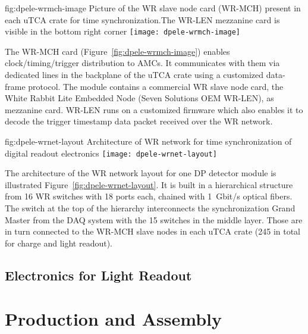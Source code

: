 \begin{dunefigure}{fig:dpele-wrmch-image}
{Picture of the WR slave node card (WR-MCH) present in each uTCA crate for time synchronization.The WR-LEN mezzanine card is visible in the bottom right corner}
\texttt{[image: dpele-wrmch-image]}
\end{dunefigure}

The WR-MCH card (Figure~\ref{fig:dpele-wrmch-image}) enables clock/timing/trigger distribution to AMCs. It communicates with them via dedicated lines in the backplane of the uTCA crate using a customized data-frame protocol. The module contains a commercial WR slave node card, the White Rabbit Lite Embedded Node (Seven Solutions OEM WR-LEN), as mezzanine card. WR-LEN runs on a customized firmware which also enables it to decode the trigger timestamp data packet received over the WR network.

\begin{dunefigure}{fig:dpele-wrnet-layout}
{Architecture of WR network for time synchronization of digital readout electronics}
\texttt{[image: dpele-wrnet-layout]}
\end{dunefigure}

The architecture of the WR network layout for one DP detector module is illustrated Figure~\ref{fig:dpele-wrnet-layout}. It is built in a hierarchical structure from \num{16} WR switches with \num{18} ports each,  chained with \SI{1}{Gbit/s} optical fibers. The switch at the top of the hierarchy interconnects the synchronization Grand Master from the DAQ system with the \num{15} switches in the middle layer. Those are in turn connected to the WR-MCH slave nodes in each uTCA crate (245 in total for charge and light readout). 


\subsection{Electronics for Light Readout}
\label{sec:fddp-tpc-elec-design-lro}


\section{Production and Assembly}
\label{sec:fddp-tpc-elec-prod-assy}

